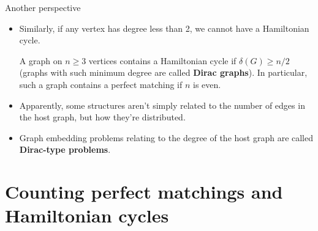 \documentclass{beamer}
\theoremstyle{plain}
\begin{document}
	\begin{frame}{Another perspective}
		\begin{itemize}
			\item Similarly, if any vertex has degree less than 2, we cannot have a Hamiltonian cycle.

			\pause

			\begin{theorem}[G. Dirac - 1952]
				A graph on $n\geq 3$ vertices contains a Hamiltonian cycle if $\delta(G)\geq n/2$ (graphs with such minimum degree are called \textbf{Dirac graphs}). In particular, such a graph contains a perfect matching if $n$ is even.
			\end{theorem}

			\pause

			\item Apparently, some structures aren't simply related to the number of edges in the host graph, but how they're distributed.
			
			\pause
			
			\item Graph embedding problems relating to the degree of the host graph are called \textbf{Dirac-type problems}.
		\end{itemize}
	\end{frame}



















\section{Counting perfect matchings and Hamiltonian cycles}
	
\end{document}
